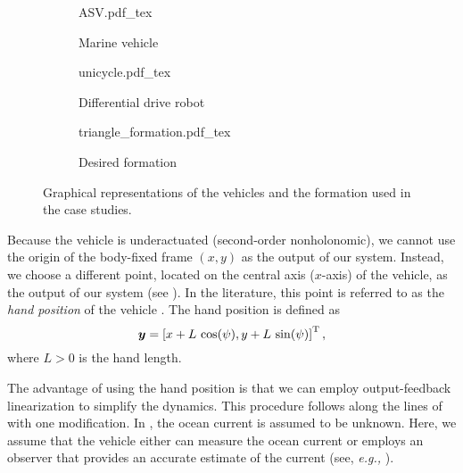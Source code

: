 \begin{figure}[b]
    \centering
    \begin{subfigure}[t]{0.15\textwidth}
        \centering
        \def\svgwidth{\textwidth}
        {ASV.pdf_tex}
        \caption{Marine vehicle}
        \label{fig:ASV}
        
    \end{subfigure}
    \begin{subfigure}[t]{0.15\textwidth}
        \centering
        \def\svgwidth{\textwidth}
        {unicycle.pdf_tex}
        \caption{Differential drive robot}
        \label{fig:unicycle}
        
    \end{subfigure}
    \begin{subfigure}[t]{0.143\textwidth}
        \centering
        \def\svgwidth{\textwidth}
        {triangle_formation.pdf_tex}
        \caption{Desired formation}
        \label{fig:triangle_formation}
        
    \end{subfigure}
    \caption{Graphical representations of the vehicles and the formation used in the case studies.}
\end{figure}

Because the vehicle is underactuated (second-order nonholonomic), we cannot use the origin of the body-fixed frame $(x,y)$ as the output of our system.
Instead, we choose a different point, located on the central axis ($x$-axis) of the vehicle, as the output of our system (see ).
In the literature, this point is referred to as the \emph{hand position} of the vehicle \cite{lawton_hand-position-formation_2003,paliotta_trajectory_2019}.
The hand position is defined as
\begin{equation}
    \bm{y} = \left[x + L\,\cos(\psi), y + L\,\sin(\psi)\right]^{\mathrm{T}}, \label{eq:hand}
\end{equation}
where $L > 0$ is the hand length.

The advantage of using the hand position is that we can employ output-feedback linearization to simplify the dynamics.
This procedure follows along the lines of \cite{paliotta_trajectory_2019} with one modification.
In \cite{paliotta_trajectory_2019}, the ocean current is assumed to be unknown.
Here, we assume that the vehicle either can measure the ocean current or employs an observer that provides an accurate estimate of the current (see, \emph{e.g.,} \cite{zhu_kalman_2016}).

